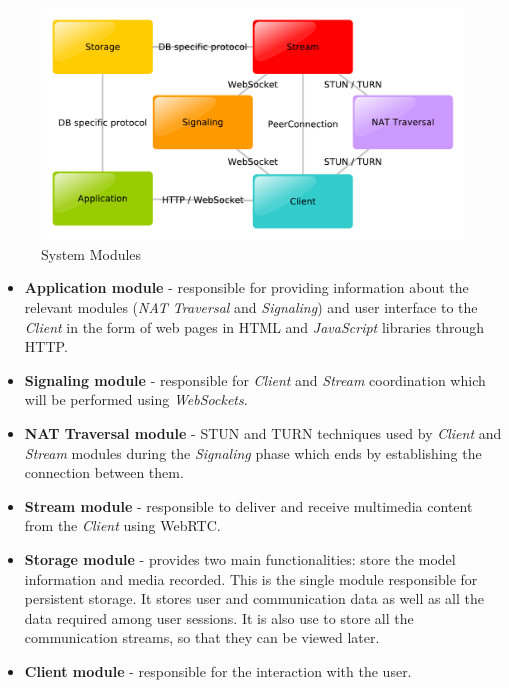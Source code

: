 \documentclass[10pt,conference]{IEEEtran}
\begin{document}
\begin{figure}
	\centering
	\includegraphics[width=\linewidth]{figures/modules.pdf}
	\caption{System Modules}
    \label{fig:modules}
\end{figure}



\begin{itemize}

\item \textbf{Application module} - responsible for providing information about the relevant modules (\emph{NAT Traversal} and \emph{Signaling}) and user interface to the \emph{Client} in the form of web pages in \gls{HTML} and \emph{JavaScript} libraries through \gls{HTTP}.
 
\item \textbf{Signaling module} - responsible for \emph{Client} and \emph{Stream} coordination which will be performed using \emph{WebSockets}.

 \item \textbf{NAT Traversal module} - \gls{STUN} and \gls{TURN} techniques used by \emph{Client} and \emph{Stream} modules during the \emph{Signaling} phase which ends by establishing the connection between them.

 \item \textbf{Stream module} - responsible to deliver and receive multimedia content from the \emph{Client} using \gls{WebRTC}. 

 \item \textbf{Storage module} - provides two main functionalities: store the model information and media recorded. This is the single module responsible for persistent storage. It stores user and communication data as well as all the data required among user sessions. It is also use to store all the communication streams, so that they can be viewed later.

 \item \textbf{Client module} - responsible for the interaction with the user.

\end{itemize}
\end{document}
